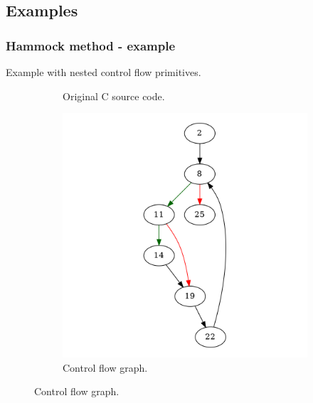 
\subsection{Examples}
\label{app:examples}



\subsubsection{Hammock method - example}

Example with nested control flow primitives.

\begin{figure}[htbp]
	\centering
	\begin{subfigure}[b]{0.48\textwidth}
		\centering
		
		\caption{Original C source code.}
	\end{subfigure}
	\begin{subfigure}[b]{0.50\textwidth}
		\centering
		\includegraphics[width=\textwidth]{inc/appendices/examples/hammock/example/without-break/main.png}
		\caption{Control flow graph.}
	\end{subfigure}
\end{figure}

